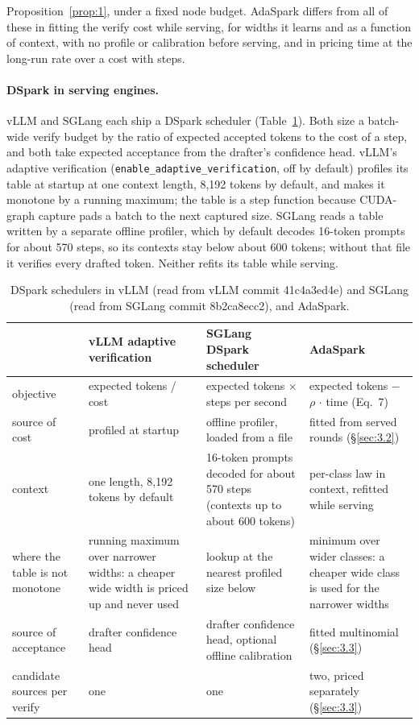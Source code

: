 \documentclass[10pt,twocolumn,letterpaper]{article}
\begin{document}
Proposition~\ref{prop:1}, under a fixed node budget. AdaSpark differs from all of these in fitting the verify cost while serving, for widths it learns and as a function of context, with no profile or calibration before serving, and in pricing time at the long-run rate over a cost with steps.

\paragraph{DSpark in serving engines.} vLLM \cite{kwon2023efficient} and SGLang \cite{zheng2024sglang} each ship a DSpark scheduler (Table~\ref{tab:vllm}). Both size a batch-wide verify budget by the ratio of expected accepted tokens to the cost of a step, and both take expected acceptance from the drafter's confidence head. vLLM's adaptive verification (\texttt{enable\_adaptive\_verification}, off by default) profiles its table at startup at one context length, 8,192 tokens by default, and makes it monotone by a running maximum; the table is a step function because CUDA-graph capture pads a batch to the next captured size. SGLang reads a table written by a separate offline profiler, which by default decodes 16-token prompts for about 570 steps, so its contexts stay below about 600 tokens; without that file it verifies every drafted token. Neither refits its table while serving.

\begin{table}[t]
\centering\small
\caption{DSpark schedulers in vLLM (read from vLLM commit 41c4a3ed4e) and SGLang (read from SGLang commit 8b2ca8ecc2), and AdaSpark.}
\label{tab:vllm}
\setlength{\tabcolsep}{4pt}
\begin{tabularx}{\textwidth}{XXXX}
\toprule
\rowcolor{head}\textbf{} & \textbf{vLLM adaptive verification} & \textbf{SGLang DSpark scheduler} & \textbf{AdaSpark} \\
\midrule
objective & expected tokens / cost & expected tokens $\times$ steps per second & expected tokens $-$ $\rho$ $\cdot$ time (Eq.~7) \\
source of cost & profiled at startup & offline profiler, loaded from a file & fitted from served rounds (\S\ref{sec:3.2}) \\
context & one length, 8,192 tokens by default & 16-token prompts decoded for about 570 steps (contexts up to about 600 tokens) & per-class law in context, refitted while serving \\
where the table is not monotone & running maximum over narrower widths: a cheaper wide width is priced up and never used & lookup at the nearest profiled size below & minimum over wider classes: a cheaper wide class is used for the narrower widths \\
source of acceptance & drafter confidence head & drafter confidence head, optional offline calibration & fitted multinomial (\S\ref{sec:3.3}) \\
candidate sources per verify & one & one & two, priced separately (\S\ref{sec:3.3}) \\
\bottomrule
\end{tabularx}
\end{table}
\end{document}
